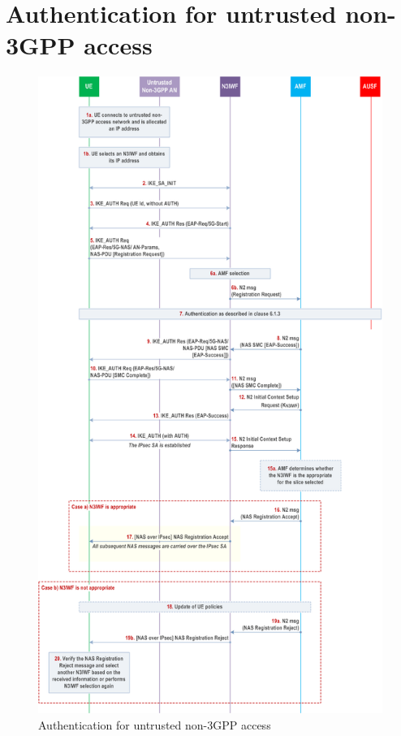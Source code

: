 \chapter{Authentication for untrusted non-\acs{3GPP} access}
\label{chapter:appendix-b}

\begin{figure}
    \centering
    \includegraphics[width=0.75\linewidth]{figs/Authentication for untrusted non-3GPP access.png}
    \caption{Authentication for untrusted non-\acs{3GPP} access}
    \label{fig:Authentication for untrusted non-3GPP access}
\end{figure}